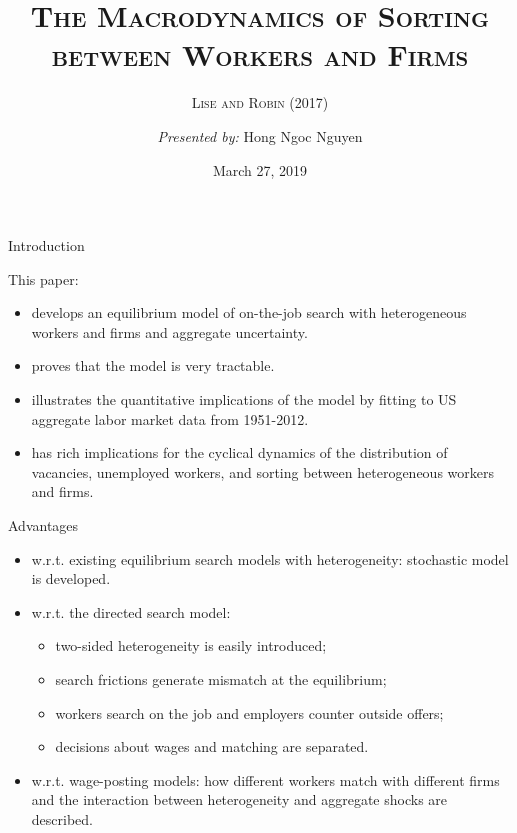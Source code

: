 \documentclass[10pt]{beamer}
\title[Temp]{\textsc{The Macrodynamics of Sorting between Workers and Firms}}
\subtitle{\textsc{Lise and Robin} (2017)}
\author{\textit{Presented by:} Hong Ngoc Nguyen}
\date{March 27, 2019}
\begin{document}
 
\begin{frame}
  \titlepage
\end{frame}


\begin{frame}{Introduction}

This paper:

\begin{itemize}
\item develops an equilibrium model of on-the-job search with heterogeneous workers and firms and aggregate uncertainty.

\item proves that the model is very tractable.

\item illustrates the quantitative implications of the model by fitting to US aggregate labor market data from 1951-2012.

\item has rich implications for the cyclical dynamics of the distribution of vacancies, unemployed workers, and sorting between heterogeneous workers and firms.
\end{itemize}

\end{frame}


\begin{frame}{Advantages}

\begin{itemize}
\item w.r.t. existing equilibrium search models with heterogeneity: stochastic model is developed.

\item w.r.t. the directed search model: 
	\begin{itemize}
	\item two-sided heterogeneity is easily introduced; 
	\item search frictions generate mismatch at the equilibrium; 
	\item workers search on the job and employers counter outside offers; 
	\item decisions about wages and matching are separated.
	\end{itemize}

\item w.r.t. wage-posting models: how different workers match with different firms and the interaction between heterogeneity and aggregate shocks are described.


\end{itemize}

\end{frame}
\end{document}
